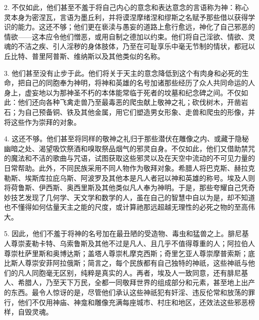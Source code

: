 2. 不仅如此，他们甚至不羞于将自己内心的意念和表达意念的言语称为神：称心灵本身为密涅瓦，言语为墨丘利，并将谟涅摩绪涅和缪斯之名赋予那些借以获得学识的能力。这还不够；他们更在亵渎与愚妄的道路上愈行愈远，神化了自己邪恶的情欲——这本应令他们憎恶，或用自制之德加以约束。他们将自己淫欲、情欲、灵魂的不洁之疾、引人淫秽的身体肢体，乃至在可耻享乐中毫无节制的情状，都冠以丘比特、普里阿普斯、维纳斯以及其他类似的名称。\par

3. 他们甚至没有止步于此。他们将关于天主的意念降低到这个有肉身和必死的生命，把自己的同胞奉为神明，将神和英雄的名号加诸那些经历了众人共同命运的人身上，虚妄地以为那神圣不朽的本体能常临于死者的坟墓和纪念碑之间。不仅如此：他们还向各种飞禽走兽乃至最毒恶的爬虫献上敬神之礼；砍伐树木，开凿岩石；为自己预备铜、铁及其他金属，用它们塑造男女形象、走兽和爬虫的形像，并将这些作为崇拜的对象。\par

4. 这还不够。他们甚至将同样的敬神之礼归于那些潜伏在雕像之内、或藏于隐秘幽暗之处、渴望吸饮祭酒和嗅取祭品烟气的邪灵自身。不仅如此，他们又借助禁咒的魔法和不洁的歌曲与咒语，试图获取这些邪灵以及在天空中流动的不可见力量的日常帮助。此外，不同民族采用不同人物作为敬拜对象。希腊人将巴克斯、赫拉克勒斯、埃斯库拉庇乌斯、阿波罗及其他本是凡人者冠以神和英雄的称号。埃及人则将荷鲁斯、伊西斯、奥西里斯及其他类似凡人奉为神明。于是，那些夸耀自己凭奇妙技艺发现了几何学、天文学和数学的人，虽在自己的智慧中自以为是，却不知道也不懂得如何估量天主之能的尺度，或计算祂那远超越无理性的必死之物的至高伟大。\par

5. 因此，他们不羞于将神的名号加在最丑陋的受造物、毒虫和猛兽之上。腓尼基人尊崇麦勒卡特、乌索鲁斯及其他不过是凡人、且几乎不值得尊重的人；阿拉伯人尊崇杜萨里斯和奥博达斯；盖塔人尊崇札摩克西斯；奇里乞亚人尊崇摩普索斯；底比斯人尊崇安菲阿拉俄斯；简言之，每个民族都有自己独特的神祇，这些神祇与他们的凡人同胞毫无区别，纯粹是真实的人。再者，埃及人一致同意，还有腓尼基人、希腊人，乃至天下万民，全都一同敬拜世界的组成部分和元素，甚至地上出产的东西。最令人惊讶的是，尽管他们承认这些神祇犯有奸淫、违反伦常和放荡的罪行，他们不仅用神庙、神龛和雕像充满每座城市、村庄和地区，还效法这些邪恶榜样，自毁灵魂。\par

